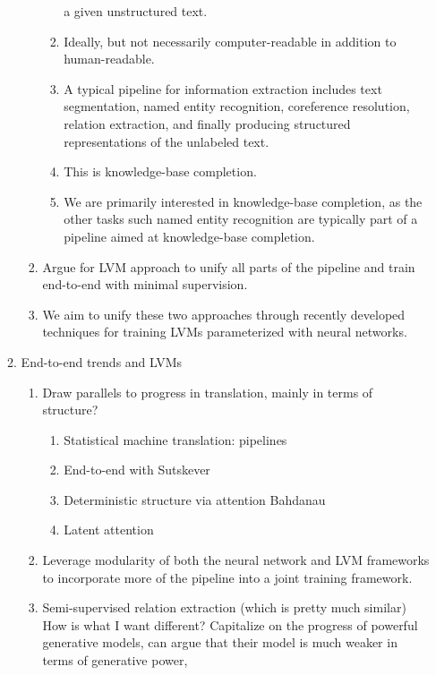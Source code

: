 \documentclass[12pt]{article}
\begin{document}
\begin{enumerate}
\begin{enumerate}
\begin{enumerate}
\begin{enumerate}
                a given unstructured text.
            \item Ideally, but not necessarily computer-readable in addition to human-readable.
            \item A typical pipeline for information extraction includes
                text segmentation, named entity recognition, coreference resolution,
                relation extraction, and finally producing structured representations of the unlabeled text.
            \item This is knowledge-base completion.
            \item We are primarily interested in knowledge-base completion,
                as the other tasks such named entity recognition are typically
                part of a pipeline aimed at knowledge-base completion.
            \end{enumerate}
        \item Argue for LVM approach to unify all parts of the pipeline and train
            end-to-end with minimal supervision.
        \item We aim to unify these two approaches through recently developed techniques for training LVMs
            parameterized with neural networks.
        \end{enumerate}
    \item End-to-end trends and LVMs
        \begin{enumerate}
        \item Draw parallels to progress in translation, mainly in terms of structure?
            \begin{enumerate}
            \item Statistical machine translation: pipelines
            \item End-to-end with Sutskever
            \item Deterministic structure via attention Bahdanau
            \item Latent attention \citet{deng2018attn}
            \end{enumerate}
        \item Leverage modularity of both the neural network and LVM frameworks
            to incorporate more of the pipeline into a joint training framework.
        \item \citet{qu2017ssre} Semi-supervised relation extraction (which is pretty much similar)
            How is what I want different? Capitalize on the progress of powerful generative models,
            can argue that their model is much weaker in terms of generative power,

\end{enumerate}
\end{enumerate}
\end{enumerate}
\end{document}
